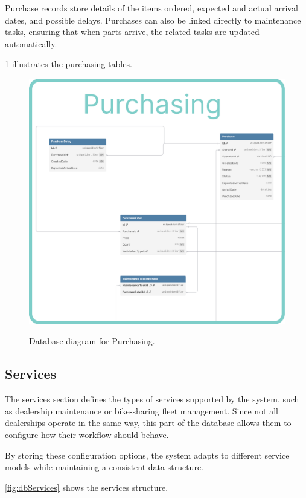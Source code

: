 Purchase records store details of the items ordered, expected and actual arrival dates, and possible delays. Purchases can also be linked directly to maintenance tasks, ensuring that when parts arrive, the related tasks are updated automatically.

\ref{fig:dbPurchasing} illustrates the purchasing tables.

\begin{figure}[h]
  \caption{Database diagram for Purchasing.}
  \centering
  \includegraphics[width=\textwidth]{figs/dbDiagrams/Purchasing}
  \label{fig:dbPurchasing}
\end{figure}


\subsection{Services} 

The services section defines the types of services supported by the system, such as dealership maintenance or bike-sharing fleet management. Since not all dealerships operate in the same way, this part of the database allows them to configure how their workflow should behave.

By storing these configuration options, the system adapts to different service models while maintaining a consistent data structure.

\ref{fig:dbServices} shows the services structure.

